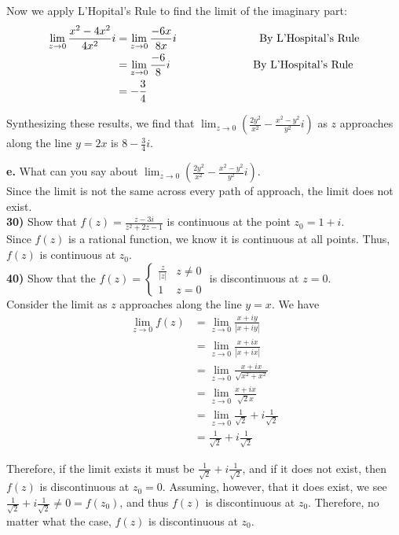 \documentclass{scrartcl}
\begin{document}
Now we apply L'Hopital's Rule to find the limit of the imaginary part:
\begin{align*}
  \lim_{z\rightarrow0} \frac{x^2 - 4x^2}{4x^2}i &= \lim_{z\rightarrow0} \frac{-6x}{8x}i \text{\hspace{1in} By L'Hospital's Rule}\\
                                             &= \lim_{z\rightarrow0} \frac{-6}{8}i \text{\hspace{1in} By L'Hospital's Rule}\\
                                             &= -\frac{3}{4}
\end{align*}

Synthesizing these results, we find that $\lim_{z\rightarrow0} \left(\frac{2y^2}{x^2} - \frac{x^2 - y^2}{y^2}i\right)$ as $z$ approaches along the line $y=2x$ is $8 - \frac{3}{4}i$.

\textbf{e.} What can you say about $\lim_{z\rightarrow0} \left(\frac{2y^2}{x^2} - \frac{x^2 - y^2}{y^2}i\right)$.\\

Since the limit is not the same across every path of approach, the limit does not exist.\\

\textbf{30)} Show that $f(z) = \frac{z-3i}{z^2+2z-1}$ is continuous at the point $z_0 = 1 + i$.\\

Since $f(z)$ is a rational function, we know it is continuous at all points. Thus, $f(z)$ is continuous at $z_0$.\\

\textbf{40)} Show that the $f(z) = 
\begin{cases} 
  \frac{z}{|z|} & z\ne0 \\
  1 & z = 0
\end{cases}$
is discontinuous at $z=0$.\\

Consider the limit as $z$ approaches along the line $y=x$. We have
\begin{align*}
  \lim_{z\rightarrow0}f(z) &= \lim_{z\rightarrow0}\frac{x + iy}{|x + iy|}\\
                         &= \lim_{z\rightarrow0}\frac{x + ix}{|x + ix|}\\
                         &= \lim_{z\rightarrow0}\frac{x + ix}{\sqrt{x^2 + x^2}}\\
                         &= \lim_{z\rightarrow0}\frac{x + ix}{\sqrt{2}x}\\
                         &= \lim_{z\rightarrow0}\frac{1}{\sqrt{2}} + i\frac{1}{\sqrt{2}}\\
                         &= \frac{1}{\sqrt{2}} + i\frac{1}{\sqrt{2}}
\end{align*}

Therefore, if the limit exists it must be $\frac{1}{\sqrt{2}} + i\frac{1}{\sqrt{2}}$, and if it does not exist, then $f(z)$ is discontinuous at $z_0=0$. Assuming, however, that it does exist, we see $\frac{1}{\sqrt{2}} + i\frac{1}{\sqrt{2}} \ne 0 = f(z_0)$, and thus $f(z)$ is discontinuous at $z_0$. Therefore, no matter what the case, $f(z)$ is discontinuous at $z_0$.
\end{document}
